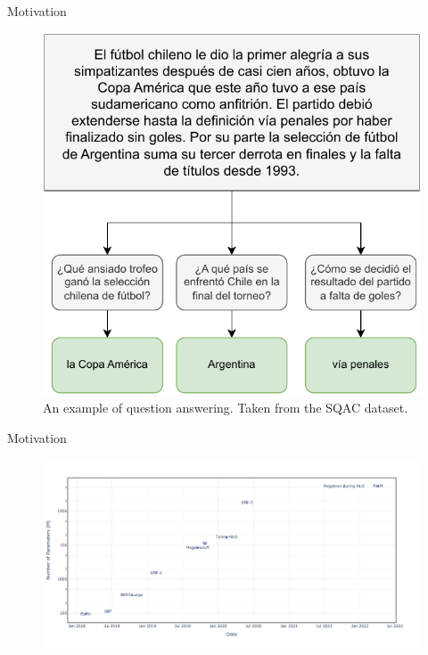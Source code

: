 \documentclass[aspectratio=169,xcolor=dvipsnames]{beamer}
\begin{document}
\begin{frame}{Motivation}

\centering
\begin{figure}
    \includegraphics[scale=0.65]{images/nlp-example-question-answering.pdf}
    \caption{An example of question answering. Taken from the SQAC \citep{gutierrezfandino2022-roberta-bne} dataset.}
    \label{fig:nlp-example-question-answering}
\end{figure}

\end{frame}
\begin{frame}{Motivation}

\centering
\begin{figure}
    \includegraphics[width=\columnwidth]{images/llms_fig.pdf}
    \label{fig:llms}
\end{figure}

\end{frame}
\end{document}
